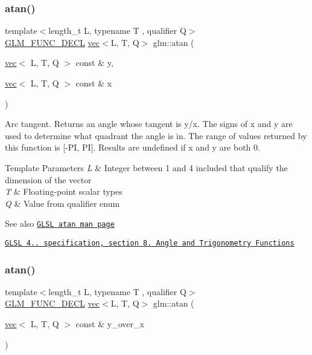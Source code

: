 \subsubsection{\texorpdfstring{atan()}{atan()}\hspace{0.1cm}{\footnotesize\ttfamily [1/2]}}
{\footnotesize\ttfamily template$<$length\+\_\+t L, typename T , qualifier Q$>$ \\
\mbox{\hyperlink{setup_8hpp_ab2d052de21a70539923e9bcbf6e83a51}{G\+L\+M\+\_\+\+F\+U\+N\+C\+\_\+\+D\+E\+CL}} \mbox{\hyperlink{structglm_1_1vec}{vec}}$<$L, T, Q$>$ glm\+::atan (\begin{DoxyParamCaption}\item[{\mbox{\hyperlink{structglm_1_1vec}{vec}}$<$ L, T, Q $>$ const \&}]{y,  }\item[{\mbox{\hyperlink{structglm_1_1vec}{vec}}$<$ L, T, Q $>$ const \&}]{x }\end{DoxyParamCaption})}

Arc tangent. Returns an angle whose tangent is y/x. The signs of x and y are used to determine what quadrant the angle is in. The range of values returned by this function is \mbox{[}-\/\+PI, PI\mbox{]}. Results are undefined if x and y are both 0.


\begin{DoxyTemplParams}{Template Parameters}
{\em L} & Integer between 1 and 4 included that qualify the dimension of the vector \\
\hline
{\em T} & Floating-\/point scalar types \\
\hline
{\em Q} & Value from qualifier enum\\
\hline
\end{DoxyTemplParams}
\begin{DoxySeeAlso}{See also}
\href{http://www.opengl.org/sdk/docs/manglsl/xhtml/atan.xml}{\tt G\+L\+SL atan man page} 

\href{http://www.opengl.org/registry/doc/GLSLangSpec.4.20.8.pdf}{\tt G\+L\+SL 4.. specification, section 8. Angle and Trigonometry Functions} 
\end{DoxySeeAlso}
\mbox{\label{group__core__func__trigonometric_ga5229f087eaccbc466f1c609ce3107b95}} 
\subsubsection{\texorpdfstring{atan()}{atan()}\hspace{0.1cm}{\footnotesize\ttfamily [2/2]}}
{\footnotesize\ttfamily template$<$length\+\_\+t L, typename T , qualifier Q$>$ \\
\mbox{\hyperlink{setup_8hpp_ab2d052de21a70539923e9bcbf6e83a51}{G\+L\+M\+\_\+\+F\+U\+N\+C\+\_\+\+D\+E\+CL}} \mbox{\hyperlink{structglm_1_1vec}{vec}}$<$L, T, Q$>$ glm\+::atan (\begin{DoxyParamCaption}\item[{\mbox{\hyperlink{structglm_1_1vec}{vec}}$<$ L, T, Q $>$ const \&}]{y\+\_\+over\+\_\+x }\end{DoxyParamCaption})}

